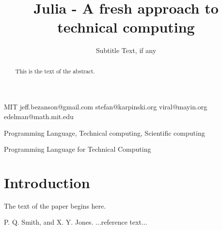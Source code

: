 \documentclass[preprint]{sigplanconf}
\begin{document}


\title{Julia - A fresh approach to technical computing}
\subtitle{Subtitle Text, if any}

           {MIT}
           {jeff.bezanson@gmail.com}
           {stefan@karpinski.org}
           {viral@mayin.org}
           {edelman@math.mit.edu}

\maketitle

\begin{abstract}
This is the text of the abstract.
\end{abstract}


\terms
Programming Language, Technical computing, Scientific computing

\keywords
Programming Language for Technical Computing

\section{Introduction}

The text of the paper begins here.









\begin{thebibliography}{}
\softraggedright

P. Q. Smith, and X. Y. Jones. ...reference text...

\end{thebibliography}
\end{document}

